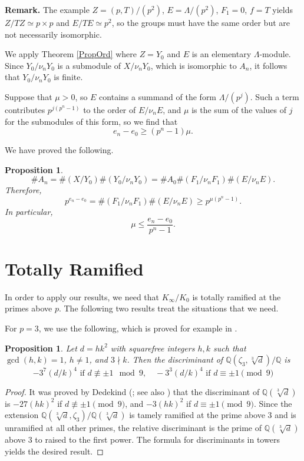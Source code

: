 \documentclass{amsart}
\newtheorem{proposition}[theorem]{Proposition}
\begin{document}
{\bf Remark.} The example $Z=(p, T)/(p^2)$, $E=\Lambda/(p^2)$, $F_1=0$, $f=T$ yields
$Z/TZ\simeq p\times p$ and $E/TE\simeq p^2$, so the groups must have the same order but are not necessarily isomorphic.

We apply Theorem \ref{PropOrd} where $Z=Y_0$ and $E$ is an elementary $\Lambda$-module.
Since $Y_0/\nu_nY_0$ is a submodule of $X/\nu_nY_0$, which is isomorphic to $A_n$, it follows that
$Y_0/\nu_nY_0$ is finite. 

Suppose that $\mu>0$, so $E$ contains a summand of the form $\Lambda/(p^j)$.
Such a term contributes $p^{j(p^n-1)}$ to the order of $E/\nu_nE$, and $\mu$ is the sum of the values of $j$
for the submodules of this form, so we find that
$$
e_n-e_0\ge (p^n-1)\mu.
$$

We have proved the following.
\begin{proposition}\label{usefulprop}
$$
\#A_n = \#(X/Y_0) \#(Y_0/\nu_n Y_0) = \#A_0 \#(F_1/\nu_n F_1) \#(E/\nu_n E).
$$
Therefore,
$$
 p^{e_n-e_0}=\#(F_1/\nu_n F_1) \#(E/\nu_n E)\ge p^{\mu(p^n-1)}.
$$
In particular, 
$$
\mu\le \frac{e_n-e_0}{p^n-1}.
$$
\end{proposition}


\section{Totally Ramified}\label{SectTotRam}

In order to apply our results, we need that $K_{\infty}/K_0$ is totally ramified
at the primes above $p$. The following two results treat the situations that we need.


For $p=3$, we use the following, which is proved for example in \cite{Chang}.

\begin{proposition} Let $d=hk^2$ with squarefree integers $h, k$ such that $\gcd(h,k)=1$, $h\ne 1$, and $3\nmid k$. Then the discriminant
of $\mathbb Q(\zeta_3,\sqrt[3]{d})/\mathbb Q$ is
$$
-3^7(d/k)^4 \text{ if } d\not\equiv \pm 1\mod 9, \quad -3^3(d/k)^4 \text{ if } d\equiv \pm 1\pmod 9
$$
\end{proposition}
\begin{proof} It was proved by Dedekind (\cite[pp. 53, 54]{Dedekind}; see also \cite[pp. 38, 49-51]{Marcus})
that the discriminant of $\mathbb Q(\sqrt[3]{d})$ is $-27(hk)^2$ if $d\not\equiv \pm 1\pmod 9$, and $-3(hk)^2$
if $d\equiv \pm 1\pmod 9$. Since the extension $\mathbb Q(\sqrt[3]{d}, \zeta_3)/\mathbb Q(\sqrt[3]{d})$ is tamely ramified at
the prime above 3 and is unramified at all other primes, the relative discriminant is the prime of $\mathbb Q(\sqrt[3]{d})$ above 3 to 
raised to the first power. The formula for discriminants in towers yields the desired result. \end{proof}
\end{document}
